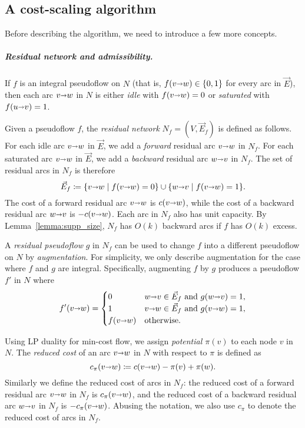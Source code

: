 \documentclass[a4paper,UKenglish,nolineno]{socg-lipics-v2019}
\makeatletter
\def\arcto{\mathord\shortrightarrow}
\def\arc#1#2{#1\arcto#2}
\def\EMPH#1{\textcolor{BrickRed}{{\emph{#1}}}}
\def\n@te#1{\textsf{\boldmath \textbf{$\langle\!\langle$#1$\rangle\!\rangle$}}\leavevmode}
\def\note#1{\textcolor{red}{\n@te{#1}}}
\makeatother
\begin{document}
\subsection{A cost-scaling algorithm}
\label{SS:cost-scale}

Before describing the algorithm, we need to introduce a few more concepts.

\subparagraph{Residual network and admissibility.}
If $f$ is an integral pseudoflow on $N$
(that is, $f(\arc{v}{w}) \in \{0, 1\}$ for every arc in $\vec{E}$), then each arc
$\arc{v}{w}$ in $N$ is either \EMPH{idle} with $f(\arc{v}{w}) = 0$ or
\EMPH{saturated} with $f(\arc{u}{v}) = 1$.

Given a pseudoflow $f$, the \EMPH{residual network} $N_f = (V, \vec{E}_f)$ is
defined as follows.
For each idle arc $\arc{v}{w}$ in $\vec{E}$, we add a \EMPH{forward} residual
arc $\arc{v}{w}$ in $N_f$.
For each saturated arc $\arc{v}{w}$ in $\vec{E}$, we add a \EMPH{backward}
residual arc $\arc{w}{v}$ in $N_f$.
The set of residual arcs in $N_f$ is therefore
\[
\vec{E}_f \coloneqq \{\arc{v}{w} \mid f(\arc{v}{w}) = 0\} \cup \{\arc{w}{v} \mid f(\arc{v}{w}) = 1\}.
\]
The cost of a forward residual arc $\arc{v}{w}$ is $c(\arc{v}{w})$,
while the cost of a backward residual arc $\arc{w}{v}$ is $-c(\arc{v}{w})$.
Each arc in $N_f$ also has unit capacity.
By Lemma~\ref{lemma:supp_size}, $N_f$ has $O(k)$ backward arcs if $f$ has $O(k)$ excess.

A \EMPH{residual pseudoflow} $g$ in $N_f$ can be used to change $f$ into a
different pseudoflow on $N$ by \EMPH{augmentation}.
For simplicity, we only describe augmentation for the case where $f$ and $g$ are integral.
Specifically, augmenting $f$ by $g$ produces a pseudoflow $f'$ in $N$ where
\[
f'(\arc vw) = \begin{cases}
	0 & {\arc wv} \in \vec{E}_f \text{ and } g(\arc wv) = 1, \\
	1 & {\arc vw} \in \vec{E}_f \text{ and } g(\arc vw) = 1, \\
	f(\arc vw) & \text{otherwise.}
\end{cases}
\]

Using LP duality for min-cost flow, we assign \EMPH{potential $\pi(v)$} to each node $v$ in $N$.
The \EMPH{reduced cost} of an arc $\arc{v}{w}$ in $N$ with respect to $\pi$ is
defined as
\[
c_\pi(\arc vw) \coloneqq c(\arc vw) - \pi(v) + \pi(w).
\]
Similarly we define the reduced cost of arcs in $N_f$: the reduced cost of a
forward residual arc $\arc vw$ in $N_f$ is $c_\pi(\arc vw)$, and the reduced cost of a
backward residual arc $\arc wv$ in $N_f$ is $-c_\pi(\arc vw)$.
Abusing the notation, we also use $c_\pi$ to denote the reduced cost of arcs in
$N_f$.
\end{document}
